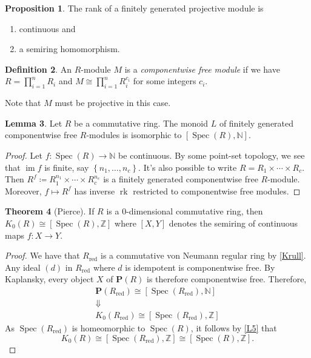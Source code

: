 \documentclass[10pt,letterpaper,cm]{nupset}
\theoremstyle{definition}
\newtheorem{definition}{Definition}[section]
\theoremstyle{theorem}
\newtheorem{theorem}[definition]{Theorem}
\newtheorem{lemma}[definition]{Lemma}
\newtheorem{prop}[definition]{Proposition}
\theoremstyle{remark}
\newcommand{\N}{\mathbb N}
\renewcommand{\P}{\mathbf P}
\newcommand{\Z}{\mathbb Z}
\newcommand{\1}{\mathbf{1}}
\newcommand{\0}{\vec 0}
\DeclareMathOperator{\im}{im}
\DeclareMathOperator{\red}{red}
\DeclareMathOperator{\spec}{Spec}
\DeclareMathOperator{\rk}{rk}
\begin{document}
\begin{prop} The rank of a finitely generated projective module is
\begin{enumerate}[label=(\alph*)]
\item continuous and
\item a semiring homomorphism.
\end{enumerate}
\end{prop}

\begin{definition}
An $R$-module $M$ is a \textit{componentwise free module} if we have $R = \prod_{i=1}^n R_i$ and $M \cong \prod_{i=1}^n R_i^{c_i}$ for some integers $c_i$.
\end{definition}

Note that $M$ must be projective in this case.

\begin{lemma}\label{L6}
Let $R$ be a commutative ring. The monoid $L$ of finitely generated componentwise free $R$-modules is isomorphic to $\left[\spec(R), \N\right]$.
\end{lemma}
\begin{proof}
Let $f: \spec(R) \to \N$ be continuous. By some point-set topology, we see that $\im f$ is finite, say $\left\{n_1, \ldots, n_c\right\}$. It's also possible to write $R= R_1 \times \cdots \times R_c$. Then $R^f \coloneqq R_1^{n_1} \times \cdots \times R_c^{n_c}$ is a finitely generated componentwise free $R$-module. Moreover, $f \mapsto R^f$ has inverse $\rk$ restricted to componentwise free modules.
\end{proof}


\begin{theorem}[Pierce]
If $R$ is a $0$-dimensional commutative ring, then $K_0(R) \cong \left[\spec(R), \Z\right]$ where $\left[X, Y\right]$ denotes the semiring of continuous maps $f: X\to Y$.
\end{theorem}
\begin{proof}
We have that $R_{\red}$ is a commutative von Neumann regular ring by \cref{Krull}. Any ideal $(d)$ in $R_{\red}$  where $d$ is idempotent is componentwise free. By Kaplansky, every object $X$ of $\P(R)$ is therefore componentwise free. Therefore, 
\begin{gather*}
\P(R_{\red}) \cong \left[\spec(R_{\red}), \N\right]
\\ \Downarrow
\\ K_0(R_{\red}) \cong \left[\spec(R_{\red}), \Z\right]
\end{gather*}
As $\spec(R_{\red})$ is homeomorphic to $\spec(R)$, it follows by \cref{L5} that $$K_0(R)\cong \left[\spec(R_{\red}), \Z\right] \cong \left[\spec(R), \Z\right].$$
\end{proof}
\end{document}

